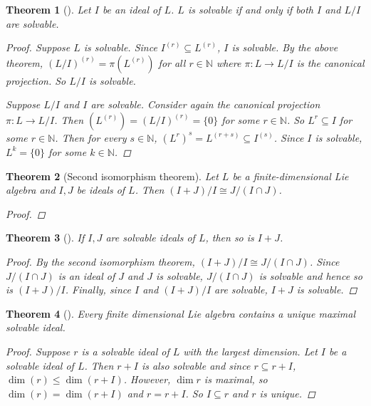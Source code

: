 \documentclass[letterpaper, 10pt]{article}
\theoremstyle{theostyle}
\newtheorem{theorem}{Theorem}[section]
\newenvironment{thmstyle}[1][]{%
    \begin{theorem}[#1]\leavevmode\vspace{-\baselineskip}\myquote%
    }{\endmyquote\end{theorem}}
\begin{document}
\begin{thmstyle}
    Let \(I\) be an ideal of \(L\).
    \(L\) is solvable if and only if both \(I\) and \(L/I\) are solvable.

    \begin{proof}
        Suppose \(L\) is solvable.
        Since \(I^{(r)} \subseteq L^{(r)}\), \(I\) is solvable.
        By the above theorem, \(\left(L/I\right)^{(r)} = \pi \left(L^{(r)}\right)\) for all \(r \in \mathbb{N}\) where 
        \(\pi: L \rightarrow L/I\) is the canonical projection.
        So \(L/I\) is solvable.

        Suppose \(L/I\) and \(I\) are solvable.
        Consider again the canonical projection \(\pi: L \rightarrow L/I\).
        Then \(\left(L^{(r)}\right) = \left(L/I\right)^{(r)} = \{0\}\) for some \(r \in \mathbb{N}\).
        So \(L^{r} \subseteq I\) for some \(r \in \mathbb{N}\).
        Then for every \(s \in \mathbb{N}\), \(\left(L^{r}\right)^{s} = L^{(r+s)} \subseteq I^{(s)}\).
        Since \(I\) is solvable, \(L^k = \{0\}\) for some \(k \in \mathbb{N}\).
    \end{proof}
\end{thmstyle}

\begin{thmstyle}[Second isomorphism theorem]
    Let \(L\) be a finite-dimensional Lie algebra and \(I,J\) be ideals of \(L\).
    Then \((I+J)/I \cong J/(I\cap J)\).

    \begin{proof}
        
    \end{proof}
\end{thmstyle}

\begin{thmstyle}
    If \(I,J\) are solvable ideals of \(L\), then so is \(I + J\).
    \begin{proof}
        By the second isomorphism theorem, \((I+J)/I \cong J/(I \cap J)\).
        Since \(J/(I \cap J)\) is an ideal of \(J\) and \(J\) is solvable, \(J/(I \cap J)\) is solvable and hence so is \((I+J)/I\).
        Finally, since \(I\) and \((I+J)/I\) are solvable, \(I + J\) is solvable. 
    \end{proof}
\end{thmstyle}

\begin{thmstyle}
    Every finite dimensional Lie algebra contains a unique maximal solvable ideal.

    \begin{proof}
        Suppose \(r\) is a solvable ideal of \(L\) with the largest dimension.
        Let \(I\) be a solvable ideal of \(L\).
        Then \(r + I\) is also solvable and since \(r \subseteq r + I\), \(\dim{(r)} \leq \dim{(r+I)}\).
        However, \(\dim{r}\) is maximal, so \(\dim{(r)} = \dim{(r+I)}\) and \(r = r + I\).
        So \(I \subseteq r\) and \(r\) is unique.
    \end{proof}
\end{thmstyle}
\end{document}
